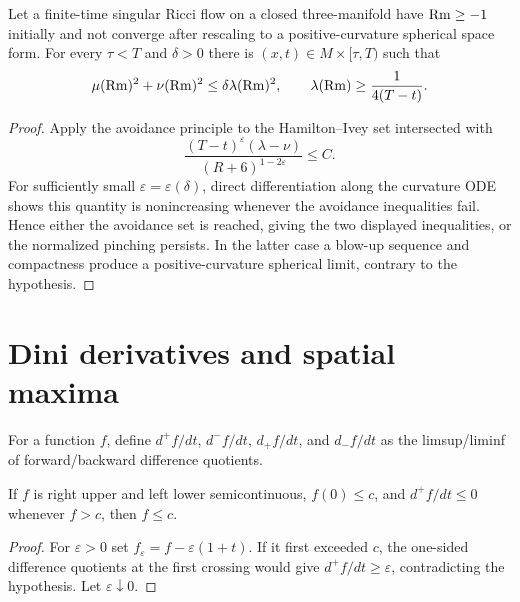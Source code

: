 \begin{theorem}
\label{thm:chow-ii-necklike-points}


Let a finite-time singular Ricci flow on a closed three-manifold have
$\operatorname{Rm}\ge-1$ initially and not converge after rescaling to a positive-curvature
spherical space form.  For every $\tau<T$ and $\delta>0$ there is
$(x,t)\in M\times[\tau,T)$ such that
\[
\mu(\operatorname{Rm})^2+\nu(\operatorname{Rm})^2\le\delta\lambda(\operatorname{Rm})^2,
\qquad
\lambda(\operatorname{Rm})\ge\frac1{4(T-t)}.
\]
\end{theorem}
\begin{proof}
\sketch
{}
Apply the avoidance principle to the Hamilton--Ivey set intersected with
\[
\frac{(T-t)^\varepsilon(\lambda-\nu)}{(R+6)^{1-2\varepsilon}}\le C.
\]
For sufficiently small $\varepsilon=\varepsilon(\delta)$, direct differentiation
along the curvature ODE shows this quantity is nonincreasing whenever the
avoidance inequalities fail.  Hence either the avoidance set is reached, giving
the two displayed inequalities, or the normalized pinching persists.  In the
latter case a blow-up sequence and compactness produce a positive-curvature
spherical limit, contrary to the hypothesis.
\end{proof}

\section{Dini derivatives and spatial maxima}

\begin{definition}
\label{def:chow-ii-dini-derivatives}

For a function $f$, define $d^+f/dt$, $d^-f/dt$, $d_+f/dt$, and $d_-f/dt$ as
the limsup/liminf of forward/backward difference quotients.
\end{definition}

\begin{lemma}
\label{lem:chow-ii-dini-upper-bound}


If $f$ is right upper and left lower semicontinuous, $f(0)\le c$, and
$d^+f/dt\le0$ whenever $f>c$, then $f\le c$.
\end{lemma}
\begin{proof}
\sketch
{}
For $\varepsilon>0$ set $f_\varepsilon=f-\varepsilon(1+t)$.  If it first exceeded
$c$, the one-sided difference quotients at the first crossing would give
$d^+f/dt\ge\varepsilon$, contradicting the hypothesis.  Let $\varepsilon\downarrow0$.
\end{proof}

